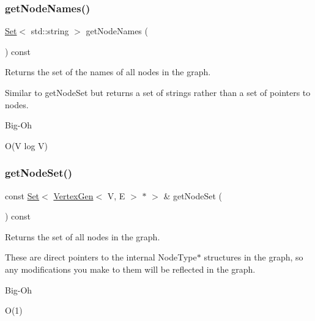 \subsubsection{\texorpdfstring{get\+Node\+Names()}{getNodeNames()}}
{\footnotesize\ttfamily \mbox{\hyperlink{classstanfordcpplib_1_1collections_1_1GenericSet}{Set}}$<$ std\+::string $>$ get\+Node\+Names (\begin{DoxyParamCaption}{ }\end{DoxyParamCaption}) const\hspace{0.3cm}{\ttfamily [inherited]}}



Returns the set of the names of all nodes in the graph. 

Similar to get\+Node\+Set but returns a set of strings rather than a set of pointers to nodes. \begin{DoxyRefDesc}{Big-\/\+Oh}
\item[\mbox{\hyperlink{BigOh__BigOh000076}{Big-\/\+Oh}}]O(\+V log V) \end{DoxyRefDesc}
\mbox{\label{classGraph_abd5552888f57aaa581099e8146c617c9}} 
\subsubsection{\texorpdfstring{get\+Node\+Set()}{getNodeSet()}}
{\footnotesize\ttfamily const \mbox{\hyperlink{classstanfordcpplib_1_1collections_1_1GenericSet}{Set}}$<$ \mbox{\hyperlink{classVertexGen}{Vertex\+Gen}}$<$ V, E $>$  $\ast$ $>$ \& get\+Node\+Set (\begin{DoxyParamCaption}{ }\end{DoxyParamCaption}) const\hspace{0.3cm}{\ttfamily [inherited]}}



Returns the set of all nodes in the graph. 

These are direct pointers to the internal Node\+Type$\ast$ structures in the graph, so any modifications you make to them will be reflected in the graph. \begin{DoxyRefDesc}{Big-\/\+Oh}
\item[\mbox{\hyperlink{BigOh__BigOh000077}{Big-\/\+Oh}}]O(1) \end{DoxyRefDesc}
\mbox{\label{classBasicGraphGen_a4c0c055103d2adba54014d301ae7bd1c}} 
